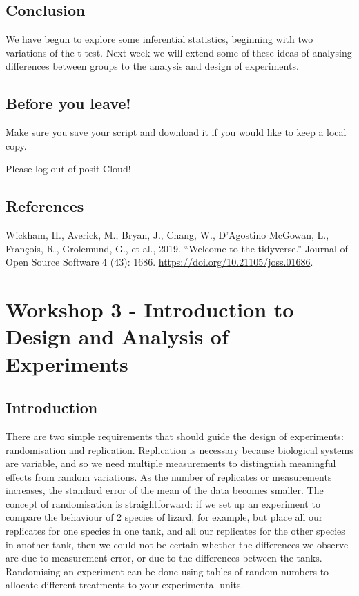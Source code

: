\documentclass[
]{book}
\begin{document}
\hypertarget{conclusion-1}{%
\section{Conclusion}\label{conclusion-1}}

We have begun to explore some inferential statistics, beginning with two variations of the t-test. Next week we will extend some of these ideas of analysing differences between groups to the analysis and design of experiments.

\hypertarget{before-you-leave-3}{%
\section{Before you leave!}\label{before-you-leave-3}}

Make sure you save your script and download it if you would like to keep a local copy.

Please log out of posit Cloud!

\hypertarget{references-2}{%
\section{References}\label{references-2}}

Wickham, H., Averick, M., Bryan, J., Chang, W., D'Agostino McGowan, L., François, R., Grolemund, G., et al., 2019. ``Welcome to the tidyverse.'' Journal of Open Source Software 4 (43): 1686. \url{https://doi.org/10.21105/joss.01686}.

\hypertarget{differences}{%
\chapter{Workshop 3 - Introduction to Design and Analysis of Experiments}\label{differences}}

\hypertarget{introduction-2}{%
\section{Introduction}\label{introduction-2}}

There are two simple requirements that should guide the design of experiments: randomisation and replication. Replication is necessary because biological systems are variable, and so we need multiple measurements to distinguish meaningful effects from random variations. As the number of replicates or measurements increases, the standard error of the mean of the data becomes smaller.
The concept of randomisation is straightforward: if we set up an experiment to compare the behaviour of 2 species of lizard, for example, but place all our replicates for one species in one tank, and all our replicates for the other species in another tank, then we could not be certain whether the differences we observe are due to measurement error, or due to the differences between the tanks. Randomising an experiment can be done using tables of random numbers to allocate different treatments to your experimental units.
\end{document}
